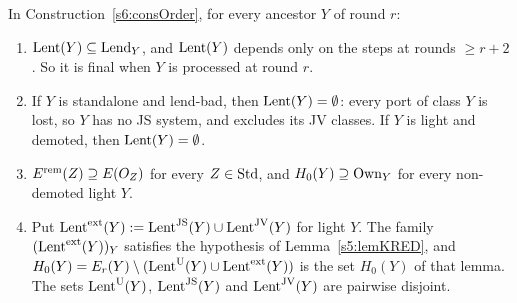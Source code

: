 \begin{lemma}\label{s6:lemLent}
In Construction~\ref{s6:consOrder}, for every ancestor $Y$ of round $r$:
\begin{enumerate}
\item[(i)] $\mathrm{Lent}(Y)\subseteq\mathrm{Lend}_Y$, and $\mathrm{Lent}(Y)$ depends only on the steps at rounds $\ge r+2$. So it is final when $Y$ is processed at round $r$.
\item[(ii)] If $Y$ is standalone and lend-bad, then $\mathrm{Lent}(Y)=\emptyset$: every port of class $Y$ is lost, so $Y$ has no JS system, and  excludes its JV classes. If $Y$ is light and demoted, then $\mathrm{Lent}(Y)=\emptyset$.
\item[(iii)] $E^{\mathrm{rem}}(Z)\supseteq E(O_Z)$ for every $Z\in\mathrm{Std}$, and $H_0(Y)\supseteq\mathrm{Own}_Y$ for every non-demoted light $Y$.
\item[(iv)] Put $\mathrm{Lent}^{\mathrm{ext}}(Y):=\mathrm{Lent}^{\mathrm{JS}}(Y)\cup\mathrm{Lent}^{\mathrm{JV}}(Y)$ for light $Y$. The family $(\mathrm{Lent}^{\mathrm{ext}}(Y))_Y$ satisfies the hypothesis of Lemma~\ref{s5:lemKRED}, and $H_0(Y)=E_r(Y)\setminus(\mathrm{Lent}^{\mathrm{U}}(Y)\cup\mathrm{Lent}^{\mathrm{ext}}(Y))$ is the set $H_0(Y)$ of that lemma. The sets $\mathrm{Lent}^{\mathrm{U}}(Y)$, $\mathrm{Lent}^{\mathrm{JS}}(Y)$ and $\mathrm{Lent}^{\mathrm{JV}}(Y)$ are pairwise disjoint.
\end{enumerate}
\deps{\ref{s6:consOrder}, \ref{s6:defLending}, \ref{s6:defJconsumer}, \ref{s6:lemJSLC}, \ref{s5:lemParent}, \ref{s5:lemKRED}, \ref{s3:defCOL}, \ref{s6:lemJplus}, \ref{s5:defStages}, \ref{s4:lemTPV}, \ref{s5:lemChild}, \ref{s5:lemDemoted}, \ref{s4:thmVXp}}
\end{lemma}

